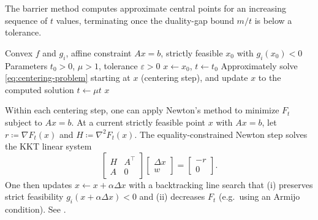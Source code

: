 The barrier method computes approximate central points for an increasing sequence of $t$ values, terminating once the duality-gap bound $m/t$ is below a tolerance.
\begin{algorithm}
  \caption{Barrier method (logarithmic barrier)}
  \label{alg:barrier-method}
  \begin{algorithmic}[1]
    \Require Convex $f$ and $g_i$, affine constraint $Ax=b$, strictly feasible $x_0$ with $g_i(x_0)<0$
    \Require Parameters $t_0>0$, $\mu>1$, tolerance $\varepsilon>0$
    \State $x\gets x_0$, $t\gets t_0$
      \State Approximately solve \eqref{eq:centering-problem} starting at $x$ (centering step), and update $x$ to the computed solution
      \State $t \gets \mu t$
    \EndWhile
    \State \Return $x$
  \end{algorithmic}
\end{algorithm}

Within each centering step, one can apply Newton's method to minimize $F_t$ subject to $Ax=b$.
At a current strictly feasible point $x$ with $Ax=b$, let $r\coloneqq \nabla F_t(x)$ and $H\coloneqq \nabla^2 F_t(x)$.
The equality-constrained Newton step solves the KKT linear system
\begin{equation}
  \begin{bmatrix}
    H & A^\top \\
    A & 0
  \end{bmatrix}
  \begin{bmatrix}
    \Delta x \\
    w
  \end{bmatrix}
  =
  \begin{bmatrix}
    -r \\
    0
  \end{bmatrix}.
  \label{eq:barrier-centering-newton}
\end{equation}
One then updates $x\gets x+\alpha \Delta x$ with a backtracking line search that (i) preserves strict feasibility $g_i(x+\alpha\Delta x)<0$ and (ii) decreases $F_t$ (e.g.\ using an Armijo condition).
See \citet[\S11.3]{boyd_vandenberghe_2004_convex}.

